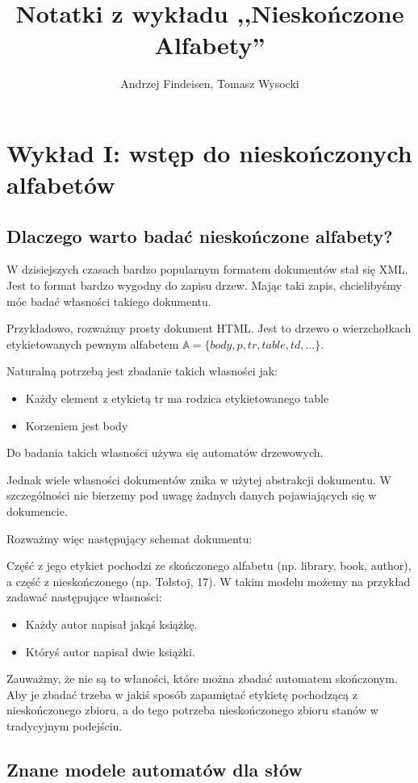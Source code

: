 \documentclass[a4paper,12pt]{report}
\title{Notatki z wykładu ,,Nieskończone Alfabety''}
\author{Andrzej Findeisen, Tomasz Wysocki}
\begin{document}
\maketitle
\newpage
\tableofcontents
\newpage
\chapter {Wykład I: wstęp do nieskończonych alfabetów}
\section {Dlaczego warto badać nieskończone alfabety?}

W dzisiejszych czasach bardzo popularnym formatem dokumentów stał się XML.
Jest to format bardzo wygodny do zapisu drzew.
Mając taki zapis, chcielibyśmy móc badać własności takiego dokumentu.

Przykładowo, rozważmy prosty dokument HTML. Jest to drzewo o wierzchołkach etykietowanych pewnym alfabetem $ \mathbb{A} = \{body, p, tr, table, td, ... \}$.

Naturalną potrzebą jest zbadanie takich własności jak:
\begin{itemize}
\item Każdy element z etykietą tr ma rodzica etykietowanego table
\item Korzeniem jest body
\end{itemize}
Do badania takich własności używa się automatów drzewowych.

Jednak wiele własności dokumentów znika w użytej abstrakcji dokumentu.
W szczególności nie bierzemy pod uwagę żadnych danych pojawiających się w dokumencie.

Rozważmy więc następujący schemat dokumentu:

Część z jego etykiet pochodzi ze skończonego alfabetu (np. library, book, author), a część z nieskończonego (np. Tołstoj, 17).
W takim modelu możemy na przykład zadawać następujące własności:
\begin{itemize}
\item Każdy autor napisał jakąś książkę.
\item Któryś autor napisał dwie książki.
\end{itemize}
Zauważmy, że nie są to właności, które można zbadać automatem skończonym. Aby je zbadać trzeba w jakiś sposób zapamiętać etykietę pochodzącą z nieskończonego zbioru, a do tego potrzeba nieskończonego zbioru stanów w tradycyjnym podejściu.

\section {Znane modele automatów dla słów}
\end{document}
